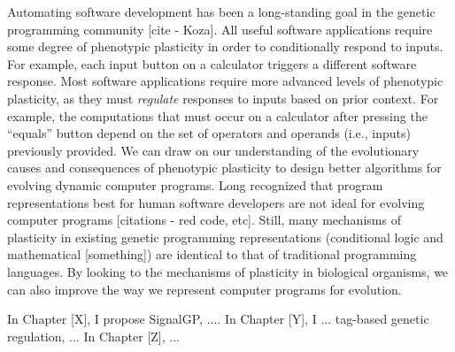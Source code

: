 Automating software development has been a long-standing goal in the genetic programming community [cite - Koza].
All useful software applications require some degree of phenotypic plasticity in order to conditionally respond to inputs.
For example, each input button on a calculator triggers a different software response.
Most software applications require more advanced levels of phenotypic plasticity, as they must \textit{regulate} responses to inputs based on prior context.
For example, the computations that must occur on a calculator after pressing the ``equals'' button depend on the set of operators and operands (i.e., inputs) previously provided.
We can draw on our understanding of the evolutionary causes and consequences of phenotypic plasticity to design better algorithms for evolving dynamic computer programs.
Long recognized that program representations best for human software developers are not ideal for evolving computer programs [citations - red code, etc].
Still, many mechanisms of plasticity in existing genetic programming representations (conditional logic and mathematical [something]) are identical to that of traditional programming languages.
By looking to the mechanisms of plasticity in biological organisms, we can also improve the way we represent computer programs for evolution. 

In Chapter [X], I propose SignalGP, ....
In Chapter [Y], I ... tag-based genetic regulation, ...
In Chapter [Z], ...